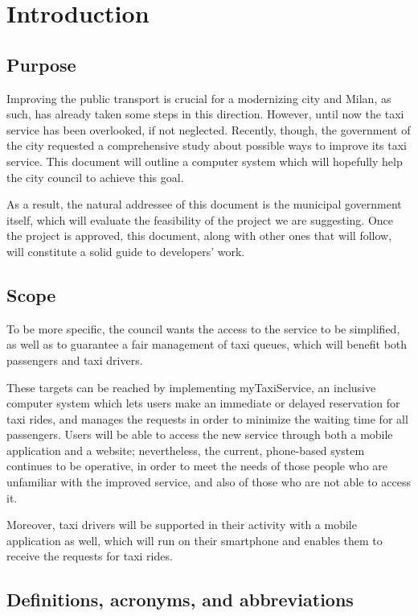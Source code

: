 \chapter{Introduction}


\section{Purpose}
Improving the public transport is crucial for a modernizing city and Milan, as such, has already taken some steps in this direction. However, until now the taxi service has been overlooked, if not neglected. Recently, though, the government of the city requested a comprehensive study about possible ways to improve its taxi service. This document will outline a computer system which will hopefully help the city council to achieve this goal.

As a result, the natural addressee of this document is the municipal government itself, which will evaluate the feasibility of the project we are suggesting. Once the project is approved, this document, along with other ones that will follow, will constitute a solid guide to developers' work.


\section{Scope}
To be more specific, the council wants the access to the service to be simplified, as well as to guarantee a fair management of taxi queues, which will benefit both passengers and taxi drivers. 

These targets can be reached by implementing myTaxiService, an inclusive computer system which lets users make an immediate or delayed reservation for taxi rides, and manages the requests in order to minimize the waiting time for all passengers. Users will be able to access the new service through both a mobile application and a website; nevertheless, the current, phone-based system continues to be operative, in order to meet the needs of those people who are unfamiliar with the improved service, and also of those who are not able to access it. 

Moreover, taxi drivers will be supported in their activity with a mobile application as well, which will run on their smartphone and enables them to receive the requests for taxi rides.


\section{Definitions, acronyms, and abbreviations}	


